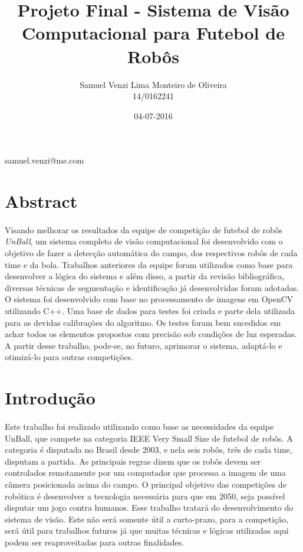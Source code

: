 \documentclass[conference, harvard, brazil, english]{sbatex}
\begin{document}
	\title{Projeto Final - Sistema de Visão Computacional para Futebol de Robôs}
	\date{04-07-2016}
	\author{Samuel Venzi Lima Monteiro de Oliveira\\14/0162241}{samuel.venzi@me.com}
	
	
	\section{Abstract}
		\paragraph{}
		Visando melhorar os resultados da equipe de competição de futebol de robôs \textit{UnBall}, um sistema completo de visão computacional foi desenvolvido com o objetivo de fazer a detecção automática do campo, dos respectivos robôs de cada time e da bola. Trabalhos anteriores da equipe foram utilizados como base para desenvolver a lógica do sistema e além disso, a partir da revisão bibliográfica, diversas técnicas de segmentação e identificação já desenvolvidas foram adotadas. O sistema foi desenvolvido com base no processamento de imagens em OpenCV utilizando C++. Uma base de dados para testes foi criada e parte dela utilizada para as devidas calibrações do algoritmo. Os testes foram bem sucedidos em achar todos os elementos propostos com precisão sob condições de luz esperadas. A partir desse trabalho, pode-se, no futuro, aprimorar o sistema, adaptá-lo e otimizá-lo para outras competições.
		
	\section{Introdução}
		\paragraph{}
		Este trabalho foi realizado utilizando como base as necessidades da equipe UnBall, que compete na categoria IEEE Very Small Size de futebol de robôs. A categoria é disputada no Brasil desde 2003, e nela seis robôs, três de cada time, disputam a partida. As principais regras dizem que os robôs devem ser controlados remotamente por um computador que processa a imagem de uma câmera posicionada acima do campo. O principal objetivo das competições de robótica é desenvolver a tecnologia necessária para que em 2050, seja possível disputar um jogo contra humanos. Esse trabalho tratará do desenvolvimento do sistema de visão. Este não será somente útil a curto-prazo, para a competição, será útil para trabalhos futuros já que muitas técnicas e lógicas utilizadas aqui podem ser reaproveitadas para outras finalidades.
\end{document}
